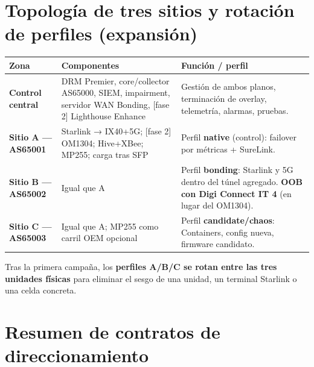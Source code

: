 \documentclass[11pt,a4paper]{article}
\newcommand{\hcell}[1]{\textbf{#1}}
\begin{document}
\section{Topología de tres sitios y rotación de perfiles (expansión)}

\begin{tabularx}{\linewidth}{@{}>{\bfseries}p{3.2cm}Xp{4.2cm}@{}}
\toprule
\hcell{Zona} & \hcell{Componentes} & \hcell{Función / perfil} \\
\midrule
Control central &
  DRM Premier, core/collector AS65000, SIEM, impairment, servidor WAN Bonding,
  [fase 2] Lighthouse Enhance &
  Gestión de ambos planos, terminación de overlay, telemetría, alarmas, pruebas. \\
\addlinespace
Sitio A — AS65001 &
  Starlink → IX40+5G; [fase 2] OM1304; Hive+XBee; MP255; carga tras SFP &
  Perfil \textbf{native} (control): failover por métricas + SureLink. \\
\addlinespace
Sitio B — AS65002 &
  Igual que A &
  Perfil \textbf{bonding}: Starlink y 5G dentro del túnel agregado.
  \textbf{OOB con Digi Connect IT 4} (en lugar del OM1304). \\
\addlinespace
Sitio C — AS65003 &
  Igual que A; MP255 como carril OEM opcional &
  Perfil \textbf{candidate/chaos}: Containers, config nueva, firmware candidato. \\
\bottomrule
\end{tabularx}

\medskip
\begin{nota}
\small
Tras la primera campaña, los \textbf{perfiles A/B/C se rotan entre las tres unidades físicas}
para eliminar el sesgo de una unidad, un terminal Starlink o una celda concreta.
\end{nota}

\section{Resumen de contratos de direccionamiento}
\end{document}
